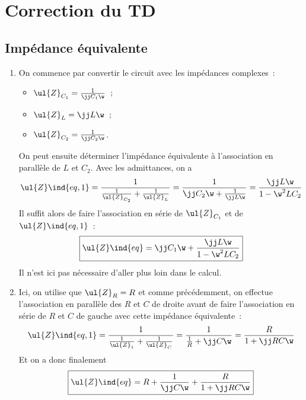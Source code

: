 \documentclass[a4paper, 12pt, final, garamond]{book}
\begin{document}
\setcounter{chapter}{4}

\chapter{Correction du TD}

\section{Impédance équivalente}
\begin{enumerate}
	\item On commence par convertir le circuit avec les impédances complexes~:
	      \begin{itemize}
		      \item $\ul{Z}_{C_1} = \frac{1}{\jj C_1\w}$~;
		      \item $\ul{Z}_L = \jj L\w$~;
		      \item $\ul{Z}_{C_2} = \frac{1}{\jj C_2\w}$.
	      \end{itemize}
	      On peut ensuite déterminer l'impédance équivalente à l'association en
	      parallèle de $L$ et $C_2$. Avec les admittances, on a
	      \begin{gather*}
		      \ul{Z}\ind{eq,1}
		      = \frac{1}{\frac{1}{\ul{Z}_{C_2}} + \frac{1}{\ul{Z}_L}}
		      = \frac{1}{\jj C_2\w + \frac{1}{\jj L\w}}
		      = \frac{\jj L\w}{1 - \w^2LC_2}
	      \end{gather*}
	      Il suffit alors de faire l'association en série de $\ul{Z}_{C_1}$ et de
	      $\ul{Z}\ind{eq,1}$~:
	      \begin{gather*}
		      \boxed{
			      \ul{Z}\ind{eq} = \jj C_1\w + \frac{\jj L\w}{1 - \w^2LC_2}}
	      \end{gather*}
	      Il n'est ici pas nécessaire d'aller plus loin dans le calcul.

	\item Ici, on utilise que $\ul{Z}_R = R$ et comme précédemment, on effectue
	      l'association en parallèle des $R$ et $C$ de droite avant de faire
	      l'association en série de $R$ et $C$ de gauche avec cette impédance
	      équivalente~:
	      \begin{gather*}
		      \ul{Z}\ind{eq, 1}
		      = \frac{1}{\frac{1}{\ul{Z}_1} + \frac{1}{\ul{Z}_C}}
		      = \frac{1}{\frac{1}{R} + \jj C\w}
		      = \frac{R}{1 + \jj RC\w}
	      \end{gather*}
	      Et on a donc finalement
	      \begin{gather*}
		      \boxed{
			      \ul{Z}\ind{eq} = R + \frac{1}{\jj C\w} + \frac{R}{1 + \jj RC\w}}
	      \end{gather*}
\end{enumerate}
\end{document}

